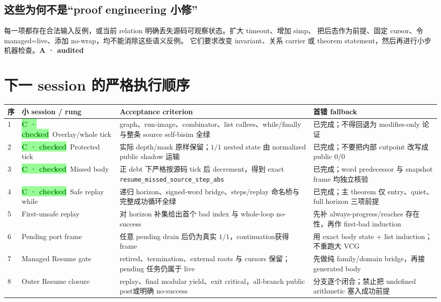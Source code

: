 \documentclass[11pt,a4paper,UTF8]{ctexart}
\newcommand{\checked}{\colorbox{paleGreen}{\textcolor{green}{\textbf{C · checked}}}}
\newcommand{\audit}{\colorbox{paleAmber}{\textcolor{amber}{\textbf{A · audited}}}}
\newcommand{\code}[1]{\nolinkurl{#1}}
\begin{document}
\subsection{这些为何不是“proof engineering 小修”}

每一项都存在合法输入反例，或当前 relation 明确丢失源码可观察状态。扩大 timeout、增加 simp、
把后态作为前提、固定 cursor、令 managed=live、添加 no-wrap，均不能消除这些语义反例。
它们要求改变 invariant、关系 carrier 或 theorem statement，然后再进行小步机器检查。\audit

\clearpage

\section{下一 session 的严格执行顺序}

{\small
\noindent\begin{tabularx}{\textwidth}{C{8mm}p{34mm}Y Y}
\toprule
序 & 小 session / rung & Acceptance criterion & 首错 fallback\\
 & \checked\ Overlay/whole tick & graph、run-image、combinator、list callees、while/finally 与整条 source self-bisim 全绿 & 已完成；不得回退为 modifies-only 论证\\
2 & \checked\ Protected tick & 实际 depth/mask 原样保留；$1/1$ nested state 由 normalized public shadow 运输 & 已完成；不要把内部 cutpoint 改写成 public $0/0$\\
3 & \checked\ Missed body & 正 debt 下严格按源码 tick 后 decrement，得到 exact \code{resume_missed_source_step_abs} & 已完成；word predecessor 与 snapshot frame 均独立核验\\
4 & \checked\ Safe replay while & 递归 horizon、signed-word bridge、steps/replay 命名桥与完整成功循环全绿 & 已完成；主 theorem 仅 entry、quiet、full horizon 三项前提\\
5 & First-unsafe replay & 对 horizon 补集给出首个 bad index 与 whole-loop no-success & 先补 always-progress/reaches 存在性，再作 first-bad induction\\
6 & Pending port frame & 任意 pending drain 后仍为真实 $1/1$，continuation获得 frame & 用 exact body state + list induction；不重跑大 VCG\\
7 & Managed Resume gate & retired、termination、external roots 与 cursors 保留；pending 任务仍属于 live & 先做纯 family/domain bridge，再接 generated body\\
8 & Outer Resume closure & replay、final modular yield、exit critical，all-branch public post或明确 no-success & 分支逐个闭合；禁止把 undefined arithmetic 塞入成功前提\\
\bottomrule
\end{tabularx}
}
\end{document}
